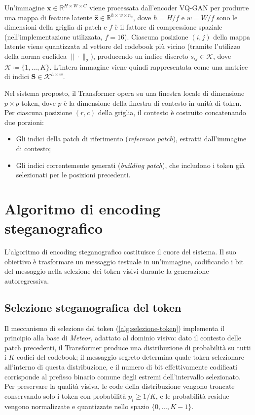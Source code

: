 Un'immagine $\mathbf{x} \in \mathbb{R}^{H \times W \times C}$ viene processata dall'encoder VQ-GAN per produrre una mappa di feature latente $\hat{\mathbf{z}} \in \mathbb{R}^{h \times w \times n_z}$, dove $h = H / f$ e $w = W / f$ sono le dimensioni della griglia di patch e $f$ è il fattore di compressione spaziale (nell'implementazione utilizzata, $f = 16$). Ciascuna posizione $(i, j)$ della mappa latente viene quantizzata al vettore del codebook più vicino (tramite l'utilizzo della norma euclidea $\|\cdot\|_2$), producendo un indice discreto $s_{ij} \in \mathcal{K}$, dove $\mathcal{K} \coloneq \{1, \dots, K\}$. L'intera immagine viene quindi rappresentata come una matrice di indici $\mathbf{S} \in \mathcal{K}^{h \times w}$.

Nel sistema proposto, il Transformer opera su una finestra locale di dimensione $p \times p$ token, dove $p$ è la dimensione della finestra di contesto in unità di token. Per ciascuna posizione $(r, c)$ della griglia, il contesto è costruito concatenando due porzioni:
\begin{itemize}[label={$\bullet$}]
	\item Gli indici della patch di riferimento (\emph{reference patch}), estratti dall'immagine di contesto;
	\item Gli indici correntemente generati (\emph{building patch}), che includono i token già selezionati per le posizioni precedenti.
\end{itemize}

\section{Algoritmo di encoding steganografico}
\label{sec:encoding-algorithm}

L'algoritmo di encoding steganografico costituisce il cuore del sistema. Il suo obiettivo è trasformare un messaggio testuale in un'immagine, codificando i bit del messaggio nella selezione dei token visivi durante la generazione autoregressiva.


\subsection{Selezione steganografica del token}

Il meccanismo di selezione del token (\autoref{alg:selezione-token}) implementa il principio alla base di \emph{Meteor}, adattato al dominio visivo: dato il contesto delle patch precedenti, il Transformer produce una distribuzione di probabilità su tutti i $K$ codici del codebook; il messaggio segreto determina quale token selezionare all'interno di questa distribuzione, e il numero di bit effettivamente codificati corrisponde al prefisso binario comune degli estremi dell'intervallo selezionato. Per preservare la qualità visiva, le code della distribuzione vengono troncate conservando solo i token con probabilità $p_i \ge 1/K$, e le probabilità residue vengono normalizzate e quantizzate nello spazio $\{0,\dots,K-1\}$.

